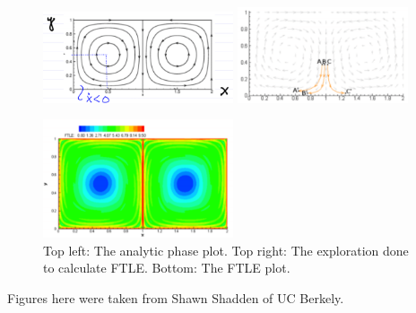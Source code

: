 \begin{ex}
\begin{figure}[h]
	\centering
	\includegraphics[width=0.5\textwidth]{figures/ch1/11contour_phase.png}
	\hspace{0.03\textwidth}
	\includegraphics[width=0.45\textwidth]{figures/ch1/12ftle_exploration.png}
	\caption{}
	\includegraphics[width=0.5\textwidth]{figures/ch1/13ftle_final.png}
	\caption{Top left: The analytic phase plot. Top right: The exploration done to calculate FTLE. Bottom: The FTLE plot.}
\end{figure}
Figures here were taken from Shawn Shadden of UC Berkely.
\end{ex}

